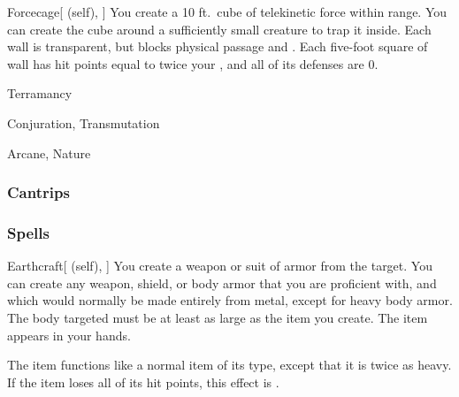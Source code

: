 \lowercase{\hypertarget{spell:Forcecage}{}}\label{spell:Forcecage}
\begin{attuneability}[\nth{7}]{\hypertarget{spell:Forcecage}{Forcecage}}[ (self), ]
\targetrule
You create a 10 ft.\ cube of telekinetic force within \rngmed range.
You can create the cube around a sufficiently small creature to trap it inside.
Each wall is transparent, but blocks physical passage and .
Each five-foot square of wall has hit points equal to twice your , and all of its defenses are 0.
\end{attuneability}
\vspace{0.25em}


\newpage
\begin{spellsection}{Terramancy}

\begin{spellheader}
\end{spellheader}


 Conjuration, Transmutation

 Arcane, Nature

\subsubsection{Cantrips}


\end{spellsection}


\subsubsection{Spells}


\lowercase{\hypertarget{spell:Earthcraft}{}}\label{spell:Earthcraft}
\begin{attuneability}[\nth{1}]{\hypertarget{spell:Earthcraft}{Earthcraft}}[ (self), ]
You create a weapon or suit of armor from the target.
You can create any weapon, shield, or body armor that you are proficient with, and which would normally be made entirely from metal, except for heavy body armor.
The body targeted must be at least as large as the item you create.
The item appears in your hands.

The item functions like a normal item of its type, except that it is twice as heavy.
If the item loses all of its hit points, this effect is .
\end{attuneability}
\vspace{0.25em}



